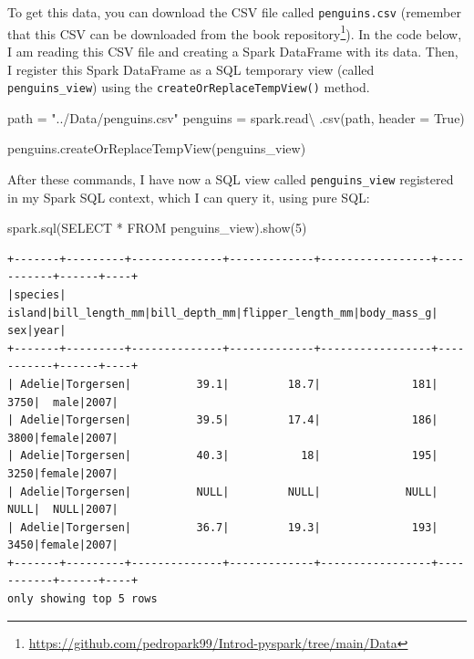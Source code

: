 \documentclass[
  11pt,
  letterpaper,
  DIV=11,
  numbers=noendperiod]{scrreprt}
\newenvironment{Shaded}{\begin{snugshade}}{\end{snugshade}}
\newcommand{\DecValTok}[1]{\textcolor[rgb]{0.68,0.00,0.00}{#1}}
\newcommand{\NormalTok}[1]{\textcolor[rgb]{0.00,0.23,0.31}{#1}}
\newcommand{\OperatorTok}[1]{\textcolor[rgb]{0.37,0.37,0.37}{#1}}
\newcommand{\StringTok}[1]{\textcolor[rgb]{0.13,0.47,0.30}{#1}}
\newcommand{\VariableTok}[1]{\textcolor[rgb]{0.07,0.07,0.07}{#1}}
\begin{document}
To get this data, you can download the CSV file called
\texttt{penguins.csv} (remember that this CSV can be downloaded from the
book repository\footnote{\url{https://github.com/pedropark99/Introd-pyspark/tree/main/Data}}).
In the code below, I am reading this CSV file and creating a Spark
DataFrame with its data. Then, I register this Spark DataFrame as a SQL
temporary view (called \texttt{penguins\_view}) using the
\texttt{createOrReplaceTempView()} method.

\begin{Shaded}
\begin{Highlighting}[]
\NormalTok{path }\OperatorTok{=} \StringTok{"../Data/penguins.csv"}
\NormalTok{penguins }\OperatorTok{=}\NormalTok{ spark.read}\OperatorTok{\textbackslash{}}
\NormalTok{  .csv(path, header }\OperatorTok{=} \VariableTok{True}\NormalTok{)}
  
\NormalTok{penguins.createOrReplaceTempView(}\StringTok{\textquotesingle{}penguins\_view\textquotesingle{}}\NormalTok{)}
\end{Highlighting}
\end{Shaded}

After these commands, I have now a SQL view called
\texttt{penguins\_view} registered in my Spark SQL context, which I can
query it, using pure SQL:

\begin{Shaded}
\begin{Highlighting}[]
\NormalTok{spark.sql(}\StringTok{\textquotesingle{}SELECT * FROM penguins\_view\textquotesingle{}}\NormalTok{).show(}\DecValTok{5}\NormalTok{)}
\end{Highlighting}
\end{Shaded}

\begin{verbatim}
+-------+---------+--------------+-------------+-----------------+-----------+------+----+
|species|   island|bill_length_mm|bill_depth_mm|flipper_length_mm|body_mass_g|   sex|year|
+-------+---------+--------------+-------------+-----------------+-----------+------+----+
| Adelie|Torgersen|          39.1|         18.7|              181|       3750|  male|2007|
| Adelie|Torgersen|          39.5|         17.4|              186|       3800|female|2007|
| Adelie|Torgersen|          40.3|           18|              195|       3250|female|2007|
| Adelie|Torgersen|          NULL|         NULL|             NULL|       NULL|  NULL|2007|
| Adelie|Torgersen|          36.7|         19.3|              193|       3450|female|2007|
+-------+---------+--------------+-------------+-----------------+-----------+------+----+
only showing top 5 rows
\end{verbatim}
\end{document}
